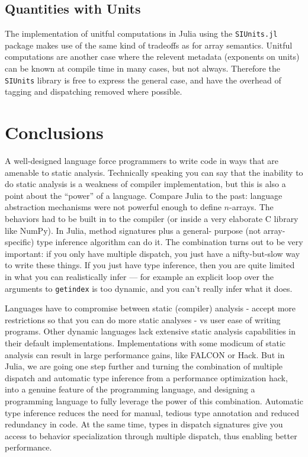 \documentclass[preprint]{sigplanconf}
\newcommand{\code}[1]{\texttt{#1}}
\begin{document}
\subsection{Quantities with Units}

The implementation of unitful computations in Julia using the
\code{SIUnits.jl}\cite{Fischer:2014si} package makes use of the same kind of
tradeoffs as for array semantics. Unitful computations are another case
where the relevent metadata (exponents on units) can be
known at compile time in many cases, but not always. Therefore the
\code{SIUnits} library is free to express the general case, and have the
overhead of tagging and dispatching removed where possible.



\section{Conclusions}

A well-designed language force programmers to write code in ways that are
amenable to static analysis. Technically speaking you can say that the
inability to do static analysis is a weakness of compiler implementation, but
this is also a point about the ``power'' of a language. Compare Julia to the
past: language abstraction mechanisms were not powerful enough to define
$n$-arrays. The behaviors had to be built in to the compiler (or inside a very
elaborate C library like NumPy). In Julia, method signatures plus a general-
purpose (not array-specific) type inference algorithm can do it. The
combination turns out to be very important: if you only have multiple
dispatch, you just have a nifty-but-slow way to write these things. If you
just have type inference, then you are quite limited in what you can
realistically infer --- for example an explicit loop over the arguments to
\code{getindex} is too dynamic, and you can't really infer what it does.

Languages have to compromise between static (compiler) analysis - accept more
restrictions so that you can do more static analyses - vs user ease of writing
programs. Other dynamic languages lack extensive static analysis capabilities
in their default implementations. Implementations with some modicum of static
analysis can result in large performance gains, like FALCON or Hack. But in
Julia, we are going one step further and turning the combination of multiple
dispatch and automatic type inference from a performance optimization hack,
into a genuine feature of the programming language, and designing a
programming language to fully leverage the power of this combination.
Automatic type inference reduces the need for manual, tedious type annotation
and reduced redundancy in code. At the same time, types in dispatch signatures
give you access to behavior specialization through multiple dispatch, thus
enabling better performance.
\end{document}

